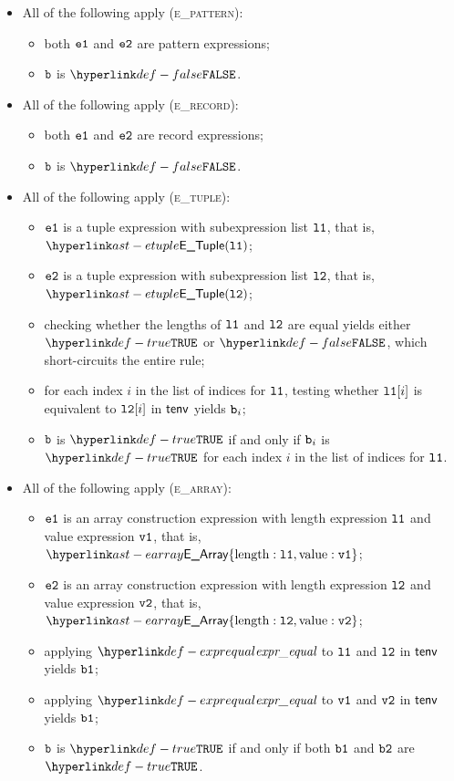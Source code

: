 \begin{itemize}
  \item All of the following apply (\textsc{e\_pattern}):
  \begin{itemize}
    \item both $\texttt{e1}$ and $\texttt{e2}$ are pattern expressions;
    \item $\texttt{b}$ is $\False$.
  \end{itemize}

  \item All of the following apply (\textsc{e\_record}):
  \begin{itemize}
    \item both $\texttt{e1}$ and $\texttt{e2}$ are record expressions;
    \item $\texttt{b}$ is $\False$.
  \end{itemize}

  \item All of the following apply (\textsc{e\_tuple}):
  \begin{itemize}
    \item $\texttt{e1}$ is a tuple expression with subexpression list $\texttt{l1}$,
          that is, $\ETuple(\vlone)$;
    \item $\texttt{e2}$ is a tuple expression with subexpression list $\texttt{l2}$,
          that is, $\ETuple(\vltwo)$;
    \item checking whether the lengths of $\texttt{l1}$ and $\texttt{l2}$ are equal yields either $\True$ or $\False$, which short-circuits
          the entire rule;
    \item for each index $i$ in the list of indices for $\texttt{l1}$, testing whether $\texttt{l1}[i]$ is equivalent to $\texttt{l2}[i]$
          in $\textsf{tenv}$ yields $\texttt{b}_i$\ProseOrTypeError;
    \item $\texttt{b}$ is $\True$ if and only if $\texttt{b}_i$ is $\True$ for each index $i$ in the list of indices for $\texttt{l1}$.
  \end{itemize}

  \item All of the following apply (\textsc{e\_array}):
  \begin{itemize}
    \item $\texttt{e1}$ is an array construction expression with length expression $\texttt{l1}$ and value expression $\texttt{v1}$,
          that is, $\EArray\{\EArrayLength: \vlone, \EArrayValue: \vvone\}$;
    \item $\texttt{e2}$ is an array construction expression with length expression $\texttt{l2}$ and value expression $\texttt{v2}$,
          that is, $\EArray\{\EArrayLength: \vltwo, \EArrayValue: \vvtwo\}$;
    \item applying $\exprequal$ to $\texttt{l1}$ and $\texttt{l2}$ in $\textsf{tenv}$ yields $\texttt{b1}$\ProseOrTypeError;
    \item applying $\exprequal$ to $\texttt{v1}$ and $\texttt{v2}$ in $\textsf{tenv}$ yields $\texttt{b1}$\ProseOrTypeError;
    \item $\texttt{b}$ is $\True$ if and only if both $\texttt{b1}$ and $\texttt{b2}$ are $\True$.
  \end{itemize}


\end{itemize}
